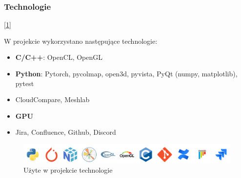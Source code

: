 
\subsubsection{Technologie} [\ref{fig:technologie}]

W projekcie wykorzystano następujące technologie:

\begin{itemize}
    \item \textbf{C/C++}: OpenCL, OpenGL
    \item \textbf{Python}: Pytorch, pycolmap, open3d, pyvista, PyQt (numpy, matplotlib), pytest
    \item CloudCompare, Meshlab
    \item \textbf{GPU}
    \item Jira, Confluence, Github, Discord
\end{itemize}

\begin{figure}[!ht]
    \centering
    \includegraphics[width=0.9\linewidth]{img/sota/technologie.png}
    \caption{Użyte w projekcie technologie}\label{fig:technologie}
  \end{figure}

